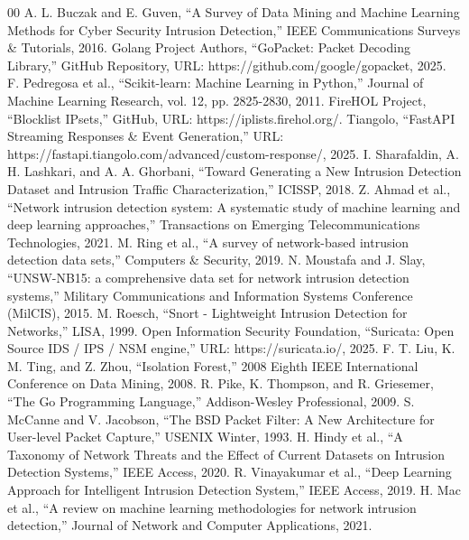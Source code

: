 \documentclass[conference]{IEEEtran}
\begin{document}
\begin{thebibliography}{00}
 A. L. Buczak and E. Guven, ``A Survey of Data Mining and Machine Learning Methods for Cyber Security Intrusion Detection,'' IEEE Communications Surveys \& Tutorials, 2016.
 Golang Project Authors, ``GoPacket: Packet Decoding Library,'' GitHub Repository, URL: https://github.com/google/gopacket, 2025.
 F. Pedregosa et al., ``Scikit-learn: Machine Learning in Python,'' Journal of Machine Learning Research, vol. 12, pp. 2825-2830, 2011.
 FireHOL Project, ``Blocklist IPsets,'' GitHub, URL: https://iplists.firehol.org/.
 Tiangolo, ``FastAPI Streaming Responses \& Event Generation,'' URL: https://fastapi.tiangolo.com/advanced/custom-response/, 2025.
 I. Sharafaldin, A. H. Lashkari, and A. A. Ghorbani, ``Toward Generating a New Intrusion Detection Dataset and Intrusion Traffic Characterization,'' ICISSP, 2018.
 Z. Ahmad et al., ``Network intrusion detection system: A systematic study of machine learning and deep learning approaches,'' Transactions on Emerging Telecommunications Technologies, 2021.
 M. Ring et al., ``A survey of network-based intrusion detection data sets,'' Computers \& Security, 2019.
 N. Moustafa and J. Slay, ``UNSW-NB15: a comprehensive data set for network intrusion detection systems,'' Military Communications and Information Systems Conference (MilCIS), 2015.
 M. Roesch, ``Snort - Lightweight Intrusion Detection for Networks,'' LISA, 1999.
 Open Information Security Foundation, ``Suricata: Open Source IDS / IPS / NSM engine,'' URL: https://suricata.io/, 2025.
 F. T. Liu, K. M. Ting, and Z. Zhou, ``Isolation Forest,'' 2008 Eighth IEEE International Conference on Data Mining, 2008.
 R. Pike, K. Thompson, and R. Griesemer, ``The Go Programming Language,'' Addison-Wesley Professional, 2009.
 S. McCanne and V. Jacobson, ``The BSD Packet Filter: A New Architecture for User-level Packet Capture,'' USENIX Winter, 1993.
 H. Hindy et al., ``A Taxonomy of Network Threats and the Effect of Current Datasets on Intrusion Detection Systems,'' IEEE Access, 2020.
 R. Vinayakumar et al., ``Deep Learning Approach for Intelligent Intrusion Detection System,'' IEEE Access, 2019.
 H. Mac et al., ``A review on machine learning methodologies for network intrusion detection,'' Journal of Network and Computer Applications, 2021.

\end{thebibliography}
\end{document}
